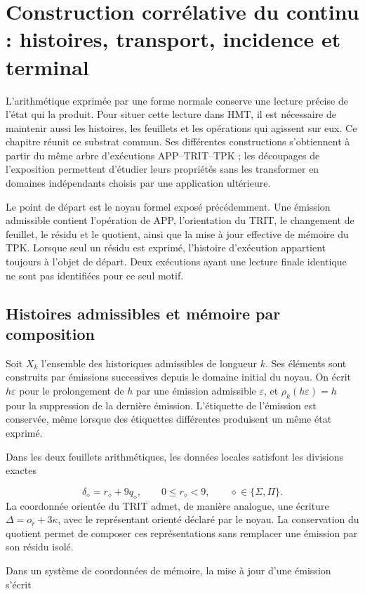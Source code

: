 \section{Construction corrélative du continu : histoires, transport, incidence et terminal}
\label{lectura:manuscrito-05}
L’arithmétique exprimée par une forme normale conserve une lecture précise de l’état qui la produit. Pour situer cette lecture dans HMT, il est nécessaire de maintenir aussi les histoires, les feuillets et les opérations qui agissent sur eux. Ce chapitre réunit ce substrat commun. Ses différentes constructions s’obtiennent à partir du même arbre d’exécutions APP–TRIT–TPK ; les découpages de l’exposition permettent d’étudier leurs propriétés sans les transformer en domaines indépendants choisis par une application ultérieure.

Le point de départ est le noyau formel exposé précédemment. Une émission admissible contient l’opération de APP, l’orientation du TRIT, le changement de feuillet, le résidu et le quotient, ainsi que la mise à jour effective de mémoire du TPK. Lorsque seul un résidu est exprimé, l’histoire d’exécution appartient toujours à l’objet de départ. Deux exécutions ayant une lecture finale identique ne sont pas identifiées pour ce seul motif.

\subsection{Histoires admissibles et mémoire par composition}
Soit \(X_k\) l'ensemble des historiques admissibles de longueur \(k\). Ses éléments sont construits par émissions successives depuis le domaine initial du noyau. On écrit \(h\varepsilon\) pour le prolongement de \(h\) par une émission admissible \(\varepsilon\), et \(\rho_k(h\varepsilon)=h\) pour la suppression de la dernière émission. L'étiquette de l'émission est conservée, même lorsque des étiquettes différentes produisent un même état exprimé.

Dans les deux feuillets arithmétiques, les données locales satisfont les divisions exactes

\[
\delta_\diamond=r_\diamond+9q_\diamond,
\qquad 0\leq r_\diamond<9,
\qquad \diamond\in\{\Sigma,\Pi\}.
\]
La coordonnée orientée du TRIT admet, de manière analogue, une écriture \(\Delta=o_r+3\kappa\), avec le représentant orienté déclaré par le noyau. La conservation du quotient permet de composer ces représentations sans remplacer une émission par son résidu isolé.

Dans un système de coordonnées de mémoire, la mise à jour d’une émission s’écrit

